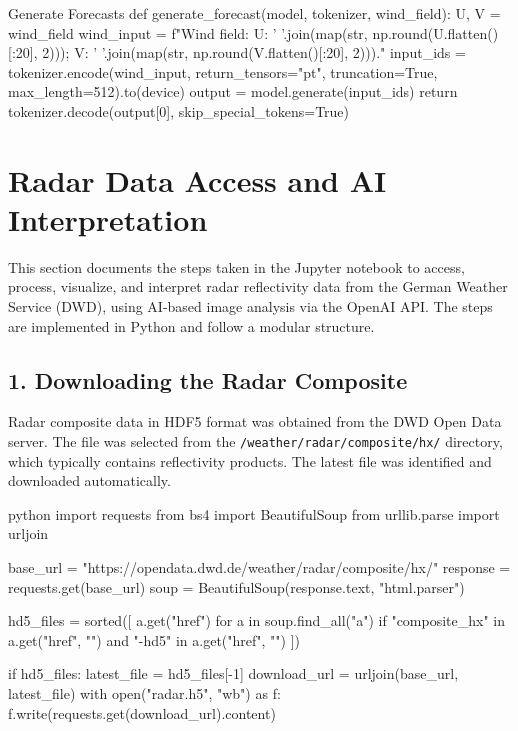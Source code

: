 \begin{codeonly}{Generate Forecasts}
def generate_forecast(model, tokenizer, wind_field):
    U, V = wind_field
    wind_input = f"Wind field: U: {' '.join(map(str, np.round(U.flatten()[:20], 2)))}; V: {' '.join(map(str, np.round(V.flatten()[:20], 2)))}."
    input_ids = tokenizer.encode(wind_input, return_tensors="pt", truncation=True, max_length=512).to(device)
    output = model.generate(input_ids)
    return tokenizer.decode(output[0], skip_special_tokens=True)
\end{codeonly}

%
\section{Radar Data Access and AI Interpretation}

This section documents the steps taken in the Jupyter notebook to access, process, visualize, and interpret radar reflectivity data from the German Weather Service (DWD), using AI-based image analysis via the OpenAI API. The steps are implemented in Python and follow a modular structure.

%
\subsection{1. Downloading the Radar Composite}

Radar composite data in HDF5 format was obtained from the DWD Open Data server. The file was selected from the \texttt{/weather/radar/composite/hx/} directory, which typically contains reflectivity products. The latest file was identified and downloaded automatically.

\begin{codeonly}{python}
import requests
from bs4 import BeautifulSoup
from urllib.parse import urljoin

base_url = "https://opendata.dwd.de/weather/radar/composite/hx/"
response = requests.get(base_url)
soup = BeautifulSoup(response.text, "html.parser")

hd5_files = sorted([
    a.get("href") for a in soup.find_all("a")
    if "composite_hx" in a.get("href", "") and "-hd5" in a.get("href", "")
])

if hd5_files:
    latest_file = hd5_files[-1]
    download_url = urljoin(base_url, latest_file)
    with open("radar.h5", "wb") as f:
        f.write(requests.get(download_url).content)
\end{codeonly}


